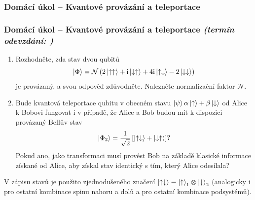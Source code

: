 \documentclass[a4paper,11pt,twoside]{article}
\newenvironment{homework}{}{}
\newcommand{\np}{\clearpage\newpage}
\newcommand{\exercise}[2][]{\ifthenelse{\isempty{#1}}
	{\np\thispagestyle{empty}\subsubsection*{Domácí úkol -- #2}}
	{\np\thispagestyle{empty}\np\subsubsection*{Domácí úkol -- #2 \small{\it{(termín odevzdání: {#1})}}}}
}
\begin{document}
\begin{homework}
	\exercise{Kvantové provázání a teleportace}
	\begin{enumerate}
		\item 
		Rozhodněte, zda stav dvou qubitů
		\begin{equation*}
			\left|{\Phi}\right\rangle=\mathcal{N}\left(2\left|{\uparrow\uparrow}\right\rangle+\mathrm{i}\left|{\downarrow\uparrow}\right\rangle+4\mathrm{i}\left|{\uparrow\downarrow}\right\rangle-2\left|{\downarrow\downarrow}\right\rangle\right)
		\end{equation*}
		je provázaný, a svou odpověď zdůvodněte. 
		Nalezněte normalizační faktor $\mathcal{N}$.

		\item
		Bude kvantová teleportace qubitu v obecném stavu $\left|{\psi}\right\rangle\alpha\left|{\uparrow}\right\rangle+\beta\left|{\downarrow}\right\rangle$ od Alice k Bobovi fungovat i v případě, že Alice a Bob budou mít k dispozici provázaný Bellův stav
		\begin{equation*}
			\left|{\Phi_{2}}\right\rangle=\frac{1}{\sqrt{2}}\left[\left|{\uparrow\downarrow}\right\rangle+\left|{\downarrow\uparrow}\right\rangle\right]?
		\end{equation*}
		Pokud ano, jako transformaci musí provést Bob na základě klasické informace získané od Alice, aby získal stav identický s tím, který Alice odesílala?
	\end{enumerate}

	V zápisu stavů je použito zjednodušeného značení $\left|{\uparrow\downarrow}\right\rangle\equiv\left|{\uparrow}\right\rangle_{1}\otimes\left|{\downarrow}\right\rangle_{2}$ (analogicky i pro ostatní kombinace spinu nahoru a dolů a pro ostatní kombinace podsystémů).

	\newpage
\end{homework}

\printindex

%
\printbibliography
%
\end{document}
